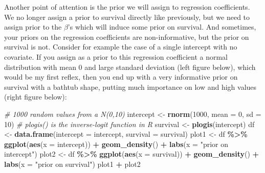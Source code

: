 \documentclass[
  12pt,
]{krantz}
\newenvironment{Shaded}{\begin{snugshade}}{\end{snugshade}}
\newcommand{\AttributeTok}[1]{\textcolor[rgb]{0.13,0.29,0.53}{#1}}
\newcommand{\CommentTok}[1]{\textcolor[rgb]{0.56,0.35,0.01}{\textit{#1}}}
\newcommand{\DecValTok}[1]{\textcolor[rgb]{0.00,0.00,0.81}{#1}}
\newcommand{\FunctionTok}[1]{\textcolor[rgb]{0.13,0.29,0.53}{\textbf{#1}}}
\newcommand{\NormalTok}[1]{#1}
\newcommand{\OtherTok}[1]{\textcolor[rgb]{0.56,0.35,0.01}{#1}}
\newcommand{\SpecialCharTok}[1]{\textcolor[rgb]{0.81,0.36,0.00}{\textbf{#1}}}
\newcommand{\StringTok}[1]{\textcolor[rgb]{0.31,0.60,0.02}{#1}}
\begin{document}
Another point of attention is the prior we will assign to regression coefficients. We no longer assign a prior to survival directly like previously, but we need to assign prior to the \(\beta\)'s which will induce some prior on survival. And sometimes, your priors on the regression coefficients are non-informative, but the prior on survival is not. Consider for example the case of a single intercept with no covariate. If you assign as a prior to this regression coefficient a normal distribution with mean 0 and large standard deviation (left figure below), which would be my first reflex, then you end up with a very informative prior on survival with a bathtub shape, putting much importance on low and high values (right figure below):

\begin{Shaded}
\begin{Highlighting}[]
\CommentTok{\# 1000 random values from a N(0,10)}
\NormalTok{intercept }\OtherTok{\textless{}{-}} \FunctionTok{rnorm}\NormalTok{(}\DecValTok{1000}\NormalTok{, }\AttributeTok{mean =} \DecValTok{0}\NormalTok{, }\AttributeTok{sd =} \DecValTok{10}\NormalTok{) }
\CommentTok{\# plogis() is the inverse{-}logit function in R}
\NormalTok{survival }\OtherTok{\textless{}{-}} \FunctionTok{plogis}\NormalTok{(intercept) }
\NormalTok{df }\OtherTok{\textless{}{-}} \FunctionTok{data.frame}\NormalTok{(}\AttributeTok{intercept =}\NormalTok{ intercept, }\AttributeTok{survival =}\NormalTok{ survival)}
\NormalTok{plot1 }\OtherTok{\textless{}{-}}\NormalTok{ df }\SpecialCharTok{\%\textgreater{}\%}
  \FunctionTok{ggplot}\NormalTok{(}\FunctionTok{aes}\NormalTok{(}\AttributeTok{x =}\NormalTok{ intercept)) }\SpecialCharTok{+}
  \FunctionTok{geom\_density}\NormalTok{() }\SpecialCharTok{+}
  \FunctionTok{labs}\NormalTok{(}\AttributeTok{x =} \StringTok{"prior on intercept"}\NormalTok{)}
\NormalTok{plot2 }\OtherTok{\textless{}{-}}\NormalTok{ df }\SpecialCharTok{\%\textgreater{}\%}
  \FunctionTok{ggplot}\NormalTok{(}\FunctionTok{aes}\NormalTok{(}\AttributeTok{x =}\NormalTok{ survival)) }\SpecialCharTok{+}
  \FunctionTok{geom\_density}\NormalTok{() }\SpecialCharTok{+}
  \FunctionTok{labs}\NormalTok{(}\AttributeTok{x =} \StringTok{"prior on survival"}\NormalTok{)}
\NormalTok{plot1 }\SpecialCharTok{+}\NormalTok{ plot2}
\end{Highlighting}
\end{Shaded}
\end{document}
